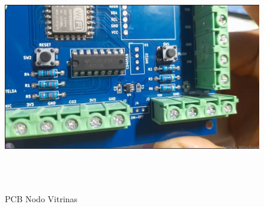 \begin{figure}[H]
    \centering
    \includegraphics[width = 14.5cm, height = 10cm]{imagenes/pcb placa.jpg}
    \caption*{PCB Nodo Vitrinas}
\end{figure}


